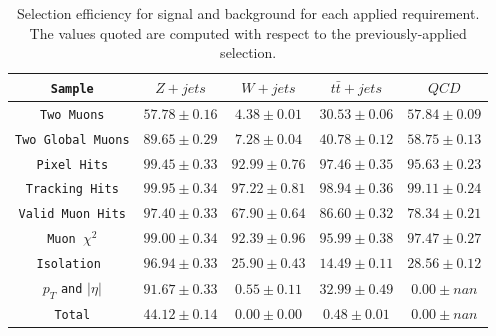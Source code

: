 \documentclass{cmspaper2}
\begin{document}
\begin{table}[htdp]
 \caption{Selection efficiency for signal and background for each
    applied requirement. The values quoted are computed with respect
    to the previously-applied selection.\label{tab:effSel}}
 \centering
 \begin{tabular}{|c|c|c|c|c|}
   \hline
   \verb|Sample| & $Z+jets$ & $W+jets$ & $t \bar t+jets$ & $QCD$ \\
   \hline
   \verb|Two Muons|          & $ 57.78 \pm 0.16 $ & $ 4.38 \pm 0.01 $ & $ 30.53 \pm 0.06 $ & $ 57.84 \pm 0.09 $ \\
   \verb|Two Global Muons|   & $ 89.65 \pm 0.29 $ & $ 7.28 \pm 0.04 $ & $ 40.78 \pm 0.12 $ & $ 58.75 \pm 0.13 $ \\
   \verb|Pixel Hits|         & $ 99.45 \pm 0.33 $ & $ 92.99 \pm 0.76 $ & $ 97.46 \pm 0.35 $ & $ 95.63 \pm 0.23 $ \\
   \verb|Tracking Hits|      & $ 99.95 \pm 0.34 $ & $ 97.22 \pm 0.81$ & $ 98.94 \pm 0.36 $ & $ 99.11 \pm 0.24 $ \\
   \verb|Valid Muon Hits|    & $ 97.40 \pm 0.33 $ & $ 67.90 \pm 0.64 $ & $ 86.60 \pm 0.32 $ & $ 78.34 \pm 0.21 $ \\
   \verb|Muon |$\chi^2$      & $ 99.00 \pm 0.34 $ & $ 92.39 \pm 0.96 $ & $ 95.99 \pm 0.38 $ & $ 97.47 \pm 0.27 $ \\
   \verb|Isolation |         & $ 96.94 \pm 0.33 $ & $ 25.90 \pm 0.43$ & $ 14.49 \pm 0.11 $ & $ 28.56 \pm 0.12 $ \\
   $p_T$ \verb|and| $|\eta|$ & $ 91.67 \pm 0.33 $ & $ 0.55 \pm 0.11 $ & $ 32.99 \pm 0.49 $ & $ 0.00 \pm nan $ \\
   \hline
   \verb|Total|              & $ 44.12 \pm 0.14 $ & $ 0.00 \pm 0.00 $ & $ 0.48 \pm 0.01 $ & $ 0.00 \pm nan $ \\
   \hline
   \end{tabular}
\label{table}
\end{table}
\end{document}

